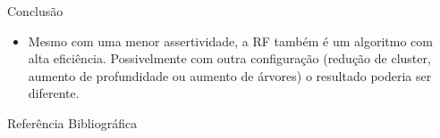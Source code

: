 \documentclass[final,hyperref={pdfpagelabels=false, brazil}]{beamer}
\let\olditem=\item%
\renewcommand{\item}{\olditem \justifying}%
\begin{document}
\begin{frame}[t]
\begin{columns}[t]
\begin{column}{.465\textwidth}
\begin{block}{Conclus\~ao}
\begin{itemize}
\item Mesmo com uma menor assertividade, a RF também é um algoritmo com alta eficiência. Possivelmente com outra configuração (redução de cluster, aumento de profundidade ou aumento de árvores) o resultado poderia ser diferente.


\end{itemize}

\end{block}


\begin{block}{Refer\^encia Bibliogr\'afica}
        
\nocite{*} %
\small{
}

\end{block}









\end{column} %

\begin{column}{.015\textwidth}\end{column} %

\end{columns} %

\end{frame} %
\end{document}
